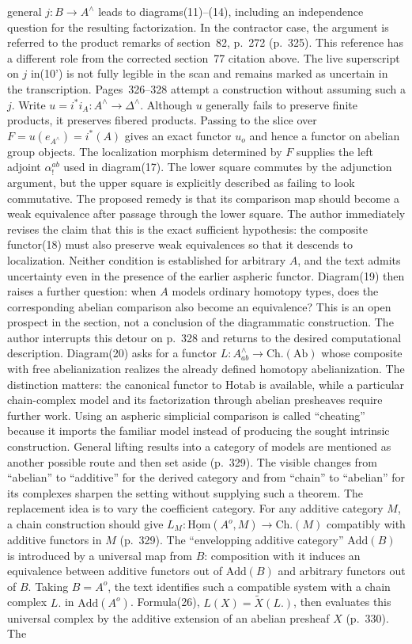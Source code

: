 \documentclass[10pt,oneside]{book}
\begin{document}
general $j:B\to A^{\wedge}$ leads to diagrams(11)--(14), including an independence question for the resulting factorization. In the contractor case, the argument is referred to the product remarks of section~82, p.~272 (p.~325). This reference has a different role from the corrected section~77 citation above. The live superscript on $j$ in(10') is not fully legible in the scan and remains marked as uncertain in the transcription. Pages~326--328 attempt a construction without assuming such a $j$. Write $u=i^*i_A:A^{\wedge}\to\Delta^{\wedge}$. Although $u$ generally fails to preserve finite products, it preserves fibered products. Passing to the slice over $F=u(e_{A^{\wedge}})=i^*(A)$ gives an exact functor $u_o$ and hence a functor on abelian group objects. The localization morphism determined by $F$ supplies the left adjoint $\alpha^{ab}_!$ used in diagram(17). The lower square commutes by the adjunction argument, but the upper square is explicitly described as failing to look commutative. The proposed remedy is that its comparison map should become a weak equivalence after passage through the lower square. The author immediately revises the claim that this is the exact sufficient hypothesis: the composite functor(18) must also preserve weak equivalences so that it descends to localization. Neither condition is established for arbitrary $A$, and the text admits uncertainty even in the presence of the earlier aspheric functor. Diagram(19) then raises a further question: when $A$ models ordinary homotopy types, does the corresponding abelian comparison also become an equivalence? This is an open prospect in the section, not a conclusion of the diagrammatic construction. The author interrupts this detour on p.~328 and returns to the desired computational description. Diagram(20) asks for a functor $L:A^{\wedge}_{ab}\to\mathrm{Ch.}(\mathrm{Ab})$ whose composite with free abelianization realizes the already defined homotopy abelianization. The distinction matters: the canonical functor to $\mathrm{Hotab}$ is available, while a particular chain-complex model and its factorization through abelian presheaves require further work. Using an aspheric simplicial comparison is called ``cheating'' because it imports the familiar model instead of producing the sought intrinsic construction. General lifting results into a category of models are mentioned as another possible route and then set aside (p.~329). The visible changes from ``abelian'' to ``additive'' for the derived category and from ``chain'' to ``abelian'' for its complexes sharpen the setting without supplying such a theorem. The replacement idea is to vary the coefficient category. For any additive category $M$, a chain construction should give $L_M:\underline{\mathrm{Hom}}(A^o,M)\to\mathrm{Ch.}(M)$ compatibly with additive functors in $M$ (p.~329). The ``envelopping additive category'' $\mathrm{Add}(B)$ is introduced by a universal map from $B$: composition with it induces an equivalence between additive functors out of $\mathrm{Add}(B)$ and arbitrary functors out of $B$. Taking $B=A^o$, the text identifies such a compatible system with a chain complex $L.$ in $\mathrm{Add}(A^o)$. Formula(26), $L(X)=\widetilde X(L.)$, then evaluates this universal complex by the additive extension of an abelian presheaf $X$ (p.~330). The 
\end{document}
